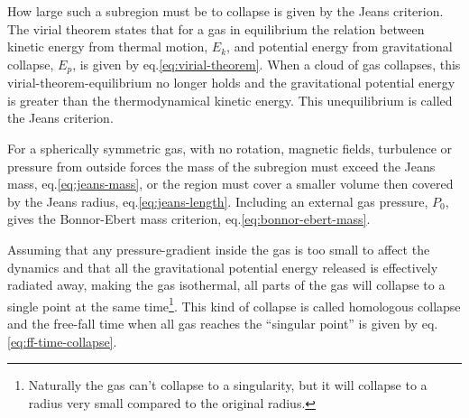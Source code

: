 \pagebreak
\noindent
\begin{minipage}{\textwidth}
  How large such a subregion must be to collapse is given by the Jeans criterion.
  The virial theorem states that for a gas in equilibrium the relation between kinetic energy from thermal motion, $E_k$, and potential energy from gravitational collapse, $E_p$, is given by eq.\ref{eq:virial-theorem}.
  When a cloud of gas collapses, this virial-theorem-equilibrium no longer holds and the gravitational potential energy is greater than the thermodynamical kinetic energy.
  This unequilibrium is called the Jeans criterion.
\end{minipage}
\begin{minipage}{0.4\textwidth}
  For a spherically symmetric gas, with no rotation, magnetic fields, turbulence or pressure from outside forces the mass of the subregion must exceed the Jeans mass, eq.\ref{eq:jeans-mass}, or the region must cover a smaller volume then covered by the Jeans radius, eq.\ref{eq:jeans-length}.
  Including an external gas pressure, $P_0$, gives the Bonnor-Ebert mass criterion, eq.\ref{eq:bonnor-ebert-mass}.
  
  Assuming that any pressure-gradient inside the gas is too small to affect the dynamics and that all the gravitational potential energy released is effectively radiated away, making the gas isothermal, all parts of the gas will collapse to a single point at the same time\footnote{Naturally the gas can't collapse to a singularity, but it will collapse to a radius very small compared to the original radius.}.
  This kind of collapse is called homologous collapse and the free-fall time when all gas reaches the ``singular point'' is given by eq.\ref{eq:ff-time-collapse}.
\end{minipage}
\hfill
